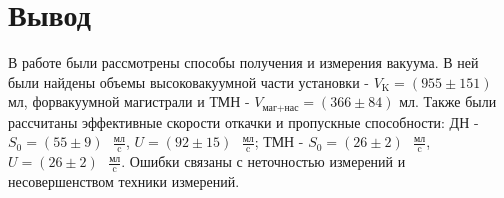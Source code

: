\documentclass[a4paper,12pt]{article} %
\begin{document}
\newpage
\section*{Вывод}
В работе были рассмотрены способы получения и измерения вакуума. В ней были найдены объемы высоковакуумной части установки - $V_{\text{K}} = (955 \pm 151)$ мл, форвакуумной магистрали и ТМН - $V_{\text{маг+нас}} = (366 \pm 84)$ мл. Также были рассчитаны эффективные скорости откачки и пропускные способности: ДН  - $S_{0} = (55 \pm 9) \text{ }\frac{\text{мл}}{\text{c}}$, $U = (92 \pm 15)\text{ }\frac{\text{мл}}{\text{c}}$; ТМН -  $S_{0} = (26 \pm 2)\text{ }\frac{\text{мл}}{\text{c}}$, $U = (26 \pm 2)\text{ }\frac{\text{мл}}{\text{c}}$. Ошибки связаны с неточностью измерений и несовершенством техники измерений.
\end{document}
